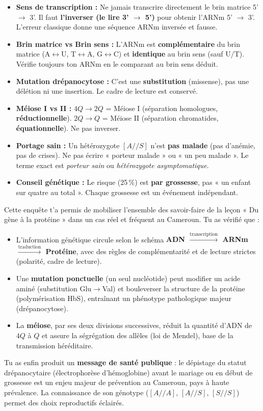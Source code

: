 \documentclass[11pt]{article}
\newcounter{popsec}
\newcounter{popsub}
\newcommand{\courssub}[1]{%
  \stepcounter{popsub}%
  \par\vspace{9pt}\noindent{\popxbold\fontsize{11.5}{13}\selectfont\color{popink}{\color{poporange}\thepopsec.\thepopsub}\hspace{6pt}#1}\par\nopagebreak\vspace{4pt}
}
\begin{document}
\begin{attention}
\begin{itemize}
\item \textbf{Sens de transcription :} Ne jamais transcrire directement le brin matrice 5' $\rightarrow$ 3'. Il faut \textbf{l'inverser (le lire 3' $\rightarrow$ 5')} pour obtenir l'ARNm 5' $\rightarrow$ 3'. L'erreur classique donne une séquence ARNm inversée et fausse.
\item \textbf{Brin matrice vs Brin sens :} L'ARNm est \textbf{complémentaire} du brin matrice (A$\leftrightarrow$U, T$\leftrightarrow$A, G$\leftrightarrow$C) et \textbf{identique} au brin sens (sauf U/T). Vérifie toujours ton ARNm en le comparant au brin sens déduit.
\item \textbf{Mutation drépanocytose :} C'est une \textbf{substitution} (missense), pas une délétion ni une insertion. Le cadre de lecture est conservé.
\item \textbf{Méiose I vs II :} $4Q \rightarrow 2Q$ = Méiose I (séparation homologues, \textbf{réductionnelle}). $2Q \rightarrow Q$ = Méiose II (séparation chromatides, \textbf{équationnelle}). Ne pas inverser.
\item \textbf{Portage sain :} Un hétérozygote $[A//S]$ n'est \textbf{pas malade} (pas d'anémie, pas de crises). Ne pas écrire « porteur malade » ou « un peu malade ». Le terme exact est \emph{porteur sain} ou \emph{hétérozygote asymptomatique}.
\item \textbf{Conseil génétique :} Le risque (25\,\%) est \textbf{par grossesse}, pas « un enfant sur quatre au total ». Chaque grossesse est un événement indépendant.
\end{itemize}
\end{attention}

\courssub{Bilan de l'activité}

Cette enquête t'a permis de mobiliser l'ensemble des savoir-faire de la leçon « Du gène à la protéine » dans un cas réel et fréquent au Cameroun. Tu as vérifié que :
\begin{itemize}
\item L'information génétique circule selon le schéma \textbf{ADN $\xrightarrow{\text{transcription}}$ ARNm $\xrightarrow{\text{traduction}}$ Protéine}, avec des règles de complémentarité et de lecture strictes (polarité, cadre de lecture).
\item Une \textbf{mutation ponctuelle} (un seul nucléotide) peut modifier un acide aminé (substitution Glu$\rightarrow$Val) et bouleverser la structure de la protéine (polymérisation HbS), entraînant un phénotype pathologique majeur (drépanocytose).
\item La \textbf{méiose}, par ses deux divisions successives, réduit la quantité d'ADN de $4Q$ à $Q$ et assure la ségrégation des allèles (loi de Mendel), base de la transmission héréditaire.
\end{itemize}
Tu as enfin produit un \textbf{message de santé publique} : le dépistage du statut drépanocytaire (électrophorèse d'hémoglobine) avant le mariage ou en début de grossesse est un enjeu majeur de prévention au Cameroun, pays à haute prévalence. La connaissance de son génotype ($[A//A]$, $[A//S]$, $[S//S]$) permet des choix reproductifs éclairés.
\end{document}

